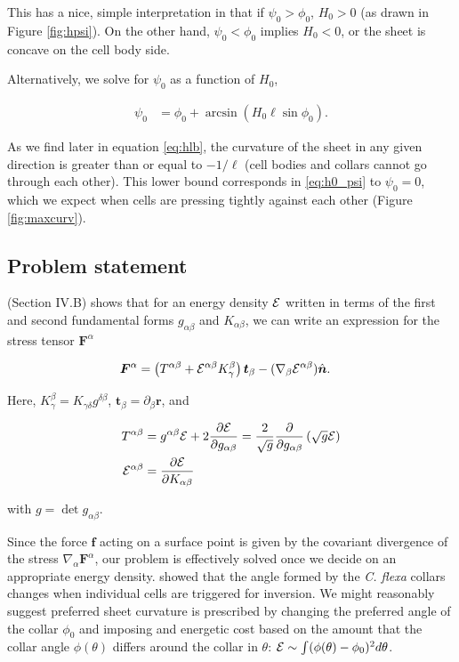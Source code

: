 This has a nice, simple interpretation in that if $\psi_0 > \phi_0$, $H_0 > 0$ (as drawn in Figure \ref{fig:hpsi}). On the other hand, $\psi_0 < \phi_0$ implies $H_0 < 0$, or the sheet is concave on the cell body side. 

Alternatively, we solve for $\psi_0$ as a function of $H_0$,

\begin{align}
    \psi_0 &= \phi_0 + \arcsin \left( H_0 \ell \sin \phi_0 \right). \label{eq:h0_psi}
\end{align}

As we find later in equation \ref{eq:hlb}, the curvature of the sheet in any given direction is greater than or equal to $-1/\ell$ (cell bodies and collars cannot go through each other). This lower bound corresponds in \ref{eq:h0_psi} to $\psi_0 = 0$, which we expect when cells are pressing tightly against each other (Figure \ref{fig:maxcurv}).


\subsection{Problem statement} \label{subsec:problem}

\citet{powers2010} (Section IV.B) shows that for an energy density $\mathcal{E}$ written in terms of the first and second fundamental forms $g_{\alpha\beta}$ and $K_{\alpha\beta}$, we can write an expression for the stress tensor $\bm{F}^\alpha$ 

\begin{align}
    \bm{F}^\alpha &= \left(T^{\alpha\beta} + \mathcal{E}^{\alpha\beta}K_\gamma^\beta \right)\bm{t}_\beta - (\nabla_\beta \mathcal{E}^{\alpha\beta})\hat{\bm{n}}. \label{eq:stress}
\end{align}

\noindent Here, $K_\gamma^\beta = K_{\gamma \delta}g^{\delta \beta}$, $\bm{t}_\beta = \partial_\beta \bm{r}$, and 

\begin{align*}
    T^{\alpha\beta} &= g^{\alpha\beta} \mathcal{E} + 2 \frac{\partial \mathcal{E}}{\partial g_{\alpha\beta}} = \frac{2}{\sqrt{g}} \frac{\partial}{\partial g_{\alpha\beta}} \left(\sqrt{g}\mathcal{E} \right) \\
    \mathcal{E}^{\alpha\beta} &= \frac{\partial \mathcal{E}}{\partial K_{\alpha\beta}}
\end{align*}

\noindent with $g = \det{g_{\alpha\beta}}$.

Since the force $\bm{f}$ acting on a surface point is given by the covariant divergence of the stress $\nabla_\alpha \bm{F}^\alpha$, our problem is effectively solved once we decide on an appropriate energy density. \citet{brunet2019} showed that the angle formed by the \textit{C. flexa} collars changes when individual cells are triggered for inversion. We might reasonably suggest preferred sheet curvature is prescribed by changing the preferred angle of the collar $\phi_0$ and imposing and energetic cost based on the amount that the collar angle $\phi(\theta)$ differs around the collar in $\theta$: $\mathcal{E} \sim \int (\phi(\theta) - \phi_0)^2 d\theta$.

